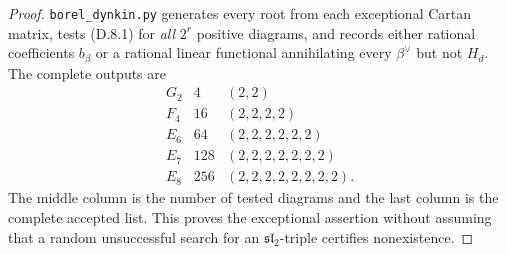 \begin{proof}
\texttt{borel\_dynkin.py} generates every root from each exceptional
Cartan matrix, tests (D.8.1) for \emph{all} $2^r$ positive diagrams,
and records either rational coefficients $b_\beta$ or a rational
linear functional annihilating every $\beta^\vee$ but not $H_d$.
The complete outputs are
\[
\begin{array}{c|r|l}
 G_2&4&(2,2)\\ F_4&16&(2,2,2,2)\\
 E_6&64&(2,2,2,2,2,2)\\
 E_7&128&(2,2,2,2,2,2,2)\\
 E_8&256&(2,2,2,2,2,2,2,2).
\end{array}
\]
The middle column is the number of tested diagrams and the last
column is the complete accepted list.  This proves the exceptional
assertion without assuming that a random unsuccessful search for
an $\mathfrak{sl}_2$-triple certifies nonexistence.
\end{proof}

